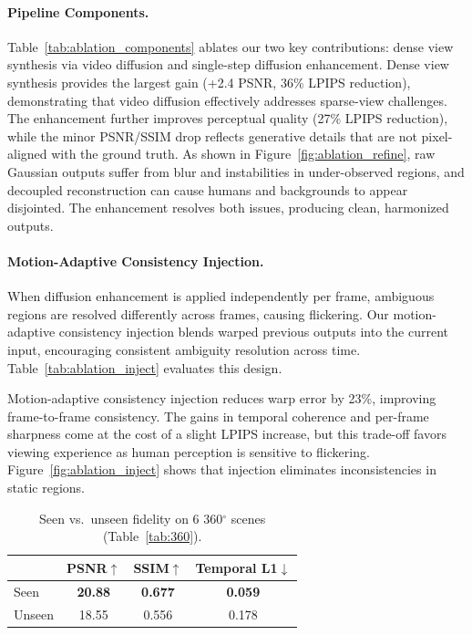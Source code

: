 \documentclass[acmtog]{acmart}
\newcommand{\degree}{$^\circ$}
\begin{document}
\paragraph{Pipeline Components.}
Table~\ref{tab:ablation_components} ablates our two key contributions: dense view synthesis via video diffusion and single-step diffusion enhancement.
Dense view synthesis provides the largest gain (+2.4 PSNR, 36\% LPIPS reduction), demonstrating that video diffusion effectively addresses sparse-view challenges. The enhancement further improves perceptual quality (27\% LPIPS reduction), while the minor PSNR/SSIM drop reflects generative details that are not pixel-aligned with the ground truth.
As shown in Figure~\ref{fig:ablation_refine}, raw Gaussian outputs suffer from blur and instabilities in under-observed regions, and decoupled reconstruction can cause humans and backgrounds to appear disjointed. The enhancement resolves both issues, producing clean, harmonized outputs.

\paragraph{Motion-Adaptive Consistency Injection.}
When diffusion enhancement is applied independently per frame, ambiguous regions are resolved differently across frames, causing flickering. Our motion-adaptive consistency injection blends warped previous outputs into the current input, encouraging consistent ambiguity resolution across time. Table~\ref{tab:ablation_inject} evaluates this design.




Motion-adaptive consistency injection reduces warp error by 23\%, improving frame-to-frame consistency. The gains in temporal coherence and per-frame sharpness come at the cost of a slight LPIPS increase, but this trade-off favors viewing experience as human perception is sensitive to flickering. Figure~\ref{fig:ablation_inject} shows that injection eliminates inconsistencies in static regions.

\begin{table}[t]
\centering
%
\caption{Seen vs.\ unseen fidelity on 6 360\degree{} scenes (Table~\ref{tab:360}).}
%
\label{tab:seen_unseen_main}
\begin{tabular}{l|cc|c}
\toprule
& PSNR$\uparrow$ & SSIM$\uparrow$ & Temporal L1$\downarrow$ \\
\midrule
Seen & \textbf{20.88} & \textbf{0.677} & \textbf{0.059} \\
Unseen & 18.55 & 0.556 & 0.178 \\
\bottomrule
\end{tabular}
%
\end{table}
\end{document}
